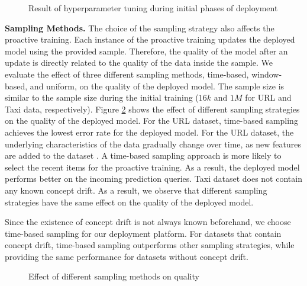 \begin{figure}[!h]
\centering
\resizebox{\columnwidth}{!}{}
\caption{Result of hyperparameter tuning during initial phases of deployment}
\label{hyper-param-figure}
\end{figure}

\textbf{Sampling Methods.}
The choice of the sampling strategy also affects the proactive training.
Each instance of the proactive training updates the deployed model using the provided sample.
Therefore, the quality of the model after an update is directly related to the quality of the data inside the sample.
We evaluate the effect of three different sampling methods, time-based, window-based, and uniform, on the quality of the deployed model.
The sample size is similar to the sample size during the initial training ($16k$ and $1M$ for URL and Taxi data, respectively).
Figure \ref{sampling-method-figure} shows the effect of different sampling strategies on the quality of the deployed model.
For the URL dataset, time-based sampling achieves the lowest error rate for the deployed model.
For the URL dataset, the underlying characteristics of the data gradually change over time, as new features are added to the dataset \cite{ma2009identifying}.
A time-based sampling approach is more likely to select the recent items for the proactive training.
As a result, the deployed model performs better on the incoming prediction queries.
Taxi dataset does not contain any known concept drift.
As a result, we observe that different sampling strategies have the same effect on the quality of the deployed model.

Since the existence of concept drift is not always known beforehand, we choose time-based sampling for our deployment platform.
For datasets that contain concept drift, time-based sampling outperforms other sampling strategies, while providing the same performance for datasets without concept drift.

\begin{figure}[!h]
\centering
\resizebox{\columnwidth}{!}{}
\caption{Effect of different sampling methods on quality}
\label{sampling-method-figure}
\end{figure}

